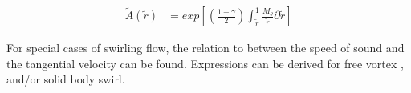 \begin{align*}
\tilde{A}(\tilde{r}) &= exp\left[\left(\frac{1 - \gamma}{2}\right)\int_{\tilde{r}}^{1}\frac{M_{\theta}}{\tilde{r}}{\partial \tilde{r}}\right]	
\end{align*}

For special cases of swirling flow, the relation to between the speed 
of sound and the tangential velocity can be found. Expressions can be derived 
for free vortex , and/or solid body swirl. 


